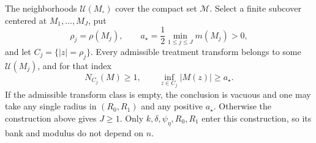 The neighborhoods \(\mathcal U(M_\circ)\) cover the compact set \(\mathscr M\).  Select a finite subcover centered at \(M_1,\ldots,M_J\), put
\[
 \rho_j=\rho(M_j),
 \qquad
 a_\star=\frac12\min_{1\le j\le J}m(M_j)>0,
\]
and let \(C_j=\{|z|=\rho_j\}\).  Every admissible treatment transform belongs to some \(\mathcal U(M_j)\), and for that index
\[
 N_{C_j}(M)\ge1,
 \qquad
 \inf_{z\in C_j}|M(z)|\ge a_\star.
\]
If the admissible transform class is empty, the conclusion is vacuous and one may take any single radius in \((R_0,R_1)\) and any positive \(a_\star\).  Otherwise the construction above gives \(J\ge1\).  Only \(k,\delta,\psi_\eta,R_0,R_1\) enter this construction, so its bank and modulus do not depend on \(n\).
